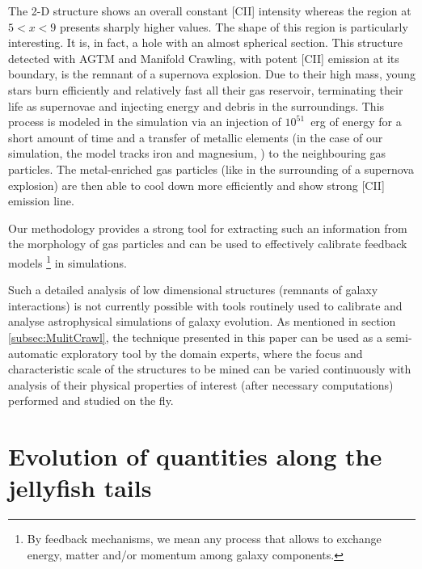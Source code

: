 The 2-D structure shows an overall constant [CII] intensity whereas the region at $5 < x < 9$ presents sharply higher values.
The shape of this region is particularly interesting. It is, in fact, a hole with an almost spherical section. This structure detected with AGTM and Manifold Crawling, with potent [CII] emission at its boundary, is the remnant of a supernova explosion. Due to their high mass, young stars burn efficiently and relatively fast all their gas reservoir, terminating their life as supernovae and injecting energy and debris in the surroundings.
This process is modeled in the simulation via an injection of $10^{51}$~erg of energy for a short amount of time and a transfer of metallic elements (in the case of our simulation, the model tracks iron and magnesium, \cite{DeRijcke2013}) to the neighbouring gas particles. The metal-enriched gas particles (like in the surrounding of a supernova explosion) are then able to cool down more efficiently and show strong [CII] emission line. 

Our methodology provides a strong tool for extracting such an information from the morphology of gas particles and can be used to effectively calibrate feedback models \footnote{By feedback mechanisms, we mean any process that allows to exchange energy, matter and/or momentum among galaxy components.} in simulations.

Such a detailed analysis of low dimensional structures (remnants of galaxy interactions) is not currently possible with tools routinely used to calibrate and analyse astrophysical simulations of galaxy evolution.
As mentioned in section \ref{subsec:MulitCrawl}, the technique presented in this paper can be used as a semi-automatic exploratory tool by the domain experts, where the focus and characteristic scale of the structures to be mined can be varied continuously with analysis of their physical properties of interest (after necessary computations) performed and studied on the fly.

\section{Evolution of quantities along the jellyfish tails}

